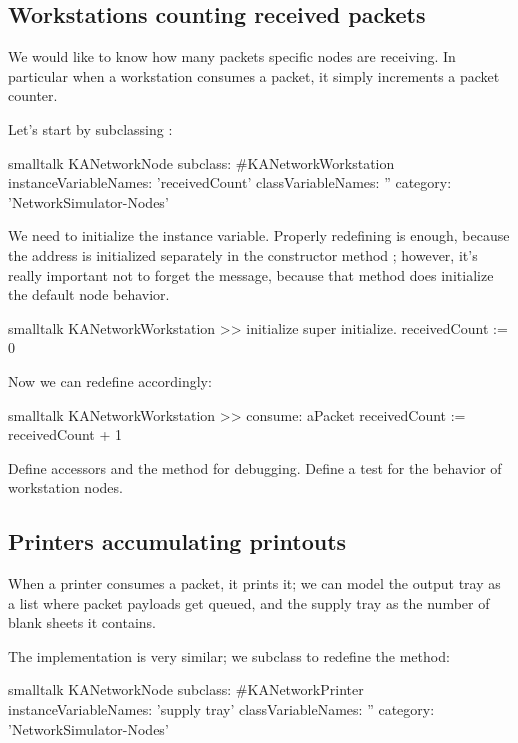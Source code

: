 \documentclass[10pt,twoside,english]{_support/latex/sbabook/sbabook}
\begin{document}
\subsection{Workstations counting received packets}
We would like to know how many packets specific nodes are receiving. 
In particular when a workstation consumes a packet, it simply increments a packet counter.

Let's start by subclassing :

\begin{displaycode}{smalltalk}
KANetworkNode subclass: #KANetworkWorkstation
    instanceVariableNames: 'receivedCount'
    classVariableNames: ''
    category: 'NetworkSimulator-Nodes'
\end{displaycode}

We need to initialize the  instance variable.
Properly redefining  is enough, because the address is initialized separately in the constructor method ; however, it's really important not to forget the  message, because that method does initialize the default node behavior.

\begin{displaycode}{smalltalk}
KANetworkWorkstation >> initialize
    super initialize.
    receivedCount := 0
\end{displaycode}

Now we can redefine  accordingly:

\begin{displaycode}{smalltalk}
KANetworkWorkstation >> consume: aPacket
    receivedCount := receivedCount + 1
\end{displaycode}

Define accessors and the  method for debugging. 
Define a test for the behavior of workstation nodes.
\subsection{Printers accumulating printouts}
When a printer consumes a packet, it prints it; we can model the output tray as a list where packet payloads get queued, and the supply tray as the number of blank sheets it contains.

The implementation is very similar; we subclass  to redefine the  method:

\begin{displaycode}{smalltalk}
KANetworkNode subclass: #KANetworkPrinter
    instanceVariableNames: 'supply tray'
    classVariableNames: ''
    category: 'NetworkSimulator-Nodes'
\end{displaycode}
\end{document}
